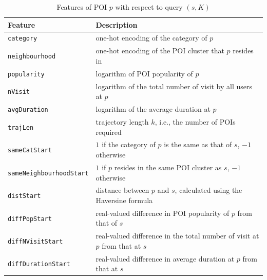 \documentclass[9pt]{extarticle}
\begin{document}
\begin{table}[ht]
\caption{Features of POI $p$ with respect to query $(s,K)$}
\label{tab:poifeature}
\centering
\setlength{\tabcolsep}{10pt} %
\begin{tabular}{l|l} \hline
\textbf{Feature}  & \textbf{Description} \\ \hline
\texttt{category}               & one-hot encoding of the category of $p$ \\
\texttt{neighbourhood}          & one-hot encoding of the POI cluster that $p$ resides in \\
\texttt{popularity}             & logarithm of POI popularity of $p$ \\
\texttt{nVisit}                 & logarithm of the total number of visit by all users at $p$ \\
\texttt{avgDuration}            & logarithm of the average duration at $p$ \\ \hline


\texttt{trajLen}                & trajectory length $k$, i.e., the number of POIs required \\
\texttt{sameCatStart}           & $1$ if the category of $p$ is the same as that of $s$, $-1$ otherwise \\
\texttt{sameNeighbourhoodStart} & $1$ if $p$ resides in the same POI cluster as $s$, $-1$ otherwise \\
\texttt{distStart}              & distance between $p$ and $s$, calculated using the Haversine formula \\
\texttt{diffPopStart}           & real-valued difference in POI popularity of $p$ from that of $s$ \\
\texttt{diffNVisitStart}        & real-valued difference in the total number of visit at $p$ from that at $s$ \\
\texttt{diffDurationStart}      & real-valued difference in average duration at $p$ from that at $s$ \\
\hline
\end{tabular}
\end{table}
\end{document}
